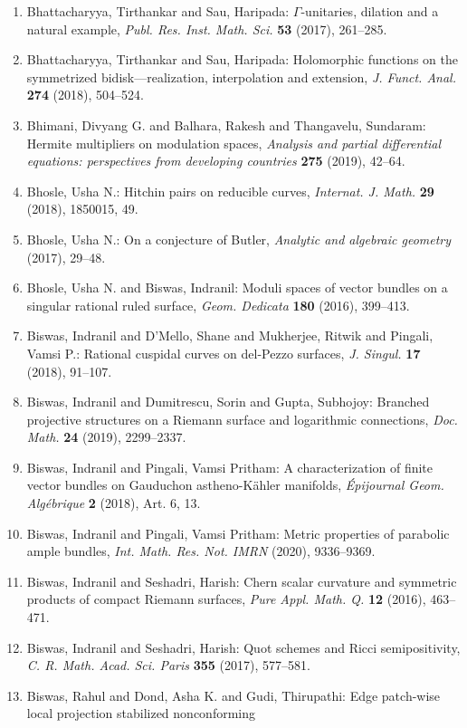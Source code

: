 \begin{enumerate}
\item Bhattacharyya, Tirthankar and Sau, Haripada: {$\Gamma$}-unitaries, dilation and a natural example, \emph{Publ. Res. Inst. Math. Sci.} {\bf 53} (2017), 261--285.
\item Bhattacharyya, Tirthankar and Sau, Haripada: Holomorphic functions on the symmetrized bidisk---realization,
interpolation and extension, \emph{J. Funct. Anal.} {\bf 274} (2018), 504--524.
\item Bhimani, Divyang G. and Balhara, Rakesh and Thangavelu,
Sundaram: Hermite multipliers on modulation spaces, \emph{Analysis and partial differential equations: perspectives from
developing countries} {\bf 275} (2019), 42--64.
\item Bhosle, Usha N.: Hitchin pairs on reducible curves, \emph{Internat. J. Math.} {\bf 29} (2018), 1850015, 49.
\item Bhosle, Usha N.: On a conjecture of {B}utler, \emph{Analytic and algebraic geometry} {\bf } (2017), 29--48.
\item Bhosle, Usha N. and Biswas, Indranil: Moduli spaces of vector bundles on a singular rational ruled
surface, \emph{Geom. Dedicata} {\bf 180} (2016), 399--413.
\item Biswas, Indranil and D'Mello, Shane and Mukherjee, Ritwik and
Pingali, Vamsi P.: Rational cuspidal curves on del-{P}ezzo surfaces, \emph{J. Singul.} {\bf 17} (2018), 91--107.
\item Biswas, Indranil and Dumitrescu, Sorin and Gupta, Subhojoy: Branched projective structures on a {R}iemann surface and
logarithmic connections, \emph{Doc. Math.} {\bf 24} (2019), 2299--2337.
\item Biswas, Indranil and Pingali, Vamsi Pritham: A characterization of finite vector bundles on {G}auduchon
astheno-{K}\"{a}hler manifolds, \emph{\'{E}pijournal Geom. Alg\'{e}brique} {\bf 2} (2018), Art. 6, 13.
\item Biswas, Indranil and Pingali, Vamsi Pritham: Metric properties of parabolic ample bundles, \emph{Int. Math. Res. Not. IMRN} {\bf } (2020), 9336--9369.
\item Biswas, Indranil and Seshadri, Harish: Chern scalar curvature and symmetric products of compact
{R}iemann surfaces, \emph{Pure Appl. Math. Q.} {\bf 12} (2016), 463--471.
\item Biswas, Indranil and Seshadri, Harish: Quot schemes and {R}icci semipositivity, \emph{C. R. Math. Acad. Sci. Paris} {\bf 355} (2017), 577--581.
\item Biswas, Rahul and Dond, Asha K. and Gudi, Thirupathi: Edge patch-wise local projection stabilized nonconforming

\end{enumerate}

